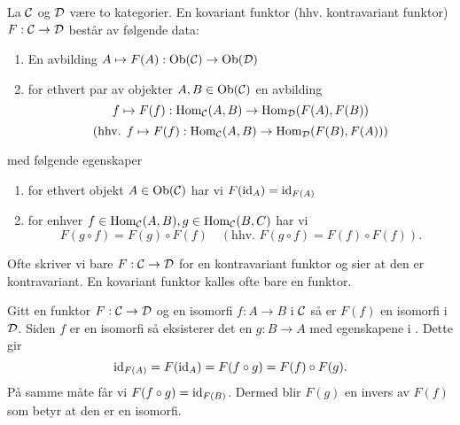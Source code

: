 \begin{definisjon}\label{def:Funktor}
  La $\mathcal{C}$ og $\mathcal{D}$ være to kategorier. En kovariant
  funktor (hhv. kontravariant funktor) $F:\mathcal{C}\to\mathcal{D}$
  består av følgende data:
  \begin{enumerate}
    \item En avbilding $A\mapsto
      F(A):\textnormal{Ob}(\mathcal{C})\to\textnormal{Ob}(\mathcal{D})$
    \item for ethvert par av objekter $A,B\in\textnormal{Ob}(\mathcal{C})$
      en avbilding
      \[f\mapsto
      F(f):\textnormal{Hom}_{\mathcal{C}}(A,B)\to\textnormal{Hom}_{\mathcal{D}}(F(A),F(B))\]
      \[(\text{hhv. } f\mapsto F(f):
      \textnormal{Hom}_{\mathcal{C}}(A,B)\to\textnormal{Hom}_{\mathcal{D}}(F(B),F(A)))\]
  \end{enumerate}
  med følgende egenskaper
  \begin{enumerate}
    \item for ethvert objekt $A\in\textnormal{Ob}(\mathcal{C})$ har vi
      $F(\textnormal{id}_A) = \textnormal{id}_{F(A)}$
    \item for enhver
      $f\in\textnormal{Hom}_{\mathcal{C}}(A,B),g\in\textnormal{Hom}_{\mathcal{C}}(B,C)$ har vi
      \[F(g\circ f) = F(g)\circ F(f)\quad (\text{hhv.
      } F(g\circ f) = F(f)\circ F(f)).\]
  \end{enumerate}

\end{definisjon}



Ofte skriver vi bare $F:\mathcal{C}\to\mathcal{D}$ for en kontravariant
funktor og sier at den er kontravariant. En kovariant
funktor kalles ofte bare en funktor.

\begin{bemerk}\label{Rem:FunktorIso}
    Gitt en funktor $F:\mathcal{C}\to\mathcal{D}$ og en isomorfi $f:A\to B$ i $\mathcal{C}$ så er $F(f)$ en isomorfi i $\mathcal{D}$. Siden $f$ er en isomorfi så eksisterer det en $g: B\to A$ med egenskapene i . Dette gir 
    \[\textnormal{id}_{F(A)} = F(\textnormal{id}_A) = F(f\circ g) = F(f)\circ F(g).\]
    På samme måte får vi $F(f\circ g) = \textnormal{id}_{F(B)}$. Dermed blir $F(g)$ en invers av $F(f)$ som betyr at den er en isomorfi.
\end{bemerk}

